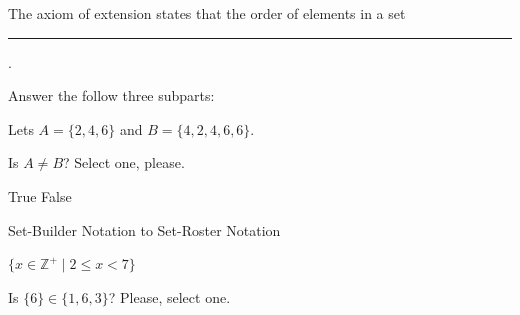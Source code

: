 \documentclass[letterpaper, 12pt]{exam}
\begin{document}
\begin{questions}

        \question The axiom of extension states that the order of elements in a set \rule{3cm}{0.15mm}.
            \newpage
            
        \question Answer the follow three subparts:
        
        \question Lets $A=\{2,4,6\}$ and $B=\{4,2,4,6,6\}$.
        
        Is $A\neq B$? Select one, please.
        
        \begin{checkboxes}
            \choice True
            \choice False
        \end{checkboxes}
        
        \question Set-Builder Notation to Set-Roster Notation

        $\{x \in \mathbb{Z}^+ \mid 2 \leq x < 7\}$
        
        \question Is $\{6\} \in \{1,6,3\}$? Please, select one.
        

\end{questions}
\end{document}

